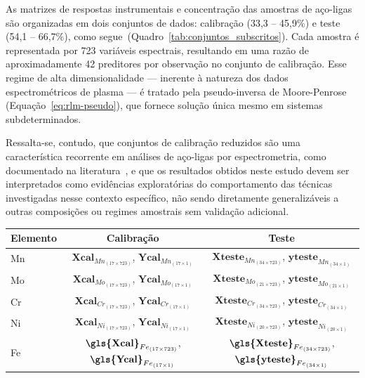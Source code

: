 \newpage

As matrizes de respostas instrumentais e concentração das amostras de aço-ligas são organizadas em dois conjuntos de dados: calibração
(33,3 -- 45,9\%) e teste (54,1 -- 66,7\%), como segue~(Quadro~\ref{tab:conjuntos_subscritos}). %
Cada amostra é representada por 723 variáveis espectrais, resultando em uma razão de aproximadamente 42 preditores por observação no conjunto de calibração. Esse regime de alta dimensionalidade — inerente à natureza dos dados espectrométricos de plasma — é tratado pela pseudo-inversa de Moore-Penrose (Equação~\ref{eq:rlm-pseudo}), que fornece solução única mesmo em sistemas subdeterminados. 

Ressalta-se, contudo, que conjuntos de calibração reduzidos são uma característica recorrente em análises de aço-ligas por espectrometria, como documentado na literatura~\cite{PIMENTEL:1998,KRAMER:1998}, e que os resultados obtidos neste estudo devem ser interpretados como evidências exploratórias do comportamento das técnicas investigadas nesse contexto específico, não sendo diretamente generalizáveis a outras composições ou regimes amostrais sem validação adicional.

\def\mna{(17 \times 723)}\def\mnb{(17 \times 1)}
\def\mnc{(34 \times 723)}\def\mnd{(21 \times 1)}
\def\mne{(21 \times 723)}\def\mnf{(34 \times 1)}
\def\mng{(20 \times 1)}\def\mnh{(20 \times 1)}
\def\mni{(20 \times 723)}\def\mnj{(17 \times 1)}
\begin{quadro}[ht]
\centering
\caption{Dimensões dos conjuntos de dados para diferentes elementos.}
\begin{tabular}{|l|c|c|}
\hline
\textbf{Elemento} & \textbf{Calibração} & \textbf{Teste} \\
\hline
Mn & $\textbf{Xcal}_{Mn_{\mna}}$, $\textbf{Ycal}_{Mn_{\mnb}}$ & $\textbf{Xteste}_{Mn_{\mnc}}$, $\textbf{yteste}_{Mn_{\mnf}}$ \\
Mo & $\textbf{Xcal}_{Mo_{\mna}}$, $\textbf{Ycal}_{Mo_{\mnb}}$ & $\textbf{Xteste}_{Mo_{\mne}}$, $\textbf{yteste}_{Mo_{\mnd}}$ \\
Cr & $\textbf{Xcal}_{Cr_{\mna}}$, $\textbf{Ycal}_{Cr_{\mnb}}$ & $\textbf{Xteste}_{Cr_{\mnc}}$, $\textbf{yteste}_{Cr_{\mnf}}$ \\
Ni & $\textbf{Xcal}_{Ni_{\mna}}$, $\textbf{Ycal}_{Ni_{\mnb}}$ & $\textbf{Xteste}_{Ni_{\mni}}$, $\textbf{yteste}_{Ni_{\mnh}}$ \\
Fe & $\textbf{\gls{Xcal}}_{Fe_{\mna}}$, $\textbf{\gls{Ycal}}_{Fe_{\mnb}}$ & $\textbf{\gls{Xteste}}_{Fe_{\mnc}}$, $\textbf{\gls{yteste}}_{Fe_{\mnf}}$ \\
\hline
\end{tabular}
\label{tab:conjuntos_subscritos}
\end{quadro}

